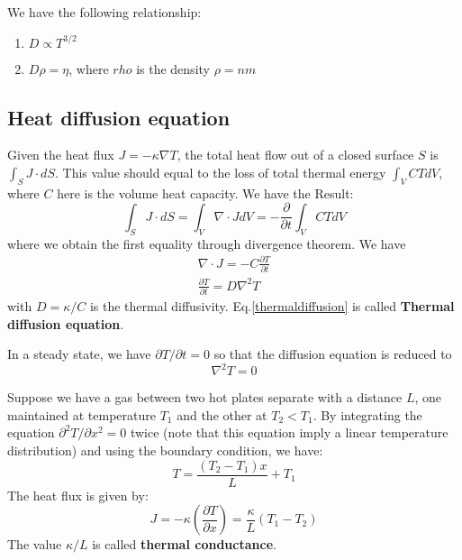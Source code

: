 \documentclass{article}
\begin{document}
We have the following relationship:
\begin{enumerate}
    \item $ D \propto T^{3/2}$
    \item $D \rho = \eta $, where $rho$ is the density $\rho = nm$
\end{enumerate}

\subsection{Heat diffusion equation}
Given the heat flux $J = - \kappa \nabla T$, the total heat flow out of a closed surface $S$ is $\int_S J \cdot dS$.
This value should equal to the loss of total thermal energy $\int_V CT dV$, where $C$ here is the volume heat capacity. 
We have the Result:
\begin{equation}
    \int_S J \cdot dS = \int_V \nabla \cdot J dV = -\frac{\partial}{\partial t} \int_V CT dV
\end{equation}
where we obtain the first equality through divergence theorem. We have
\begin{align}
    \nabla \cdot J = -C \frac{\partial T}{\partial t} \\
    \frac{\partial T}{\partial t} = D \nabla^2 T \label{thermaldiffusion}
\end{align}
with $D = \kappa/C$ is the thermal diffusivity.
Eq.\ref{thermaldiffusion} is called \textbf{Thermal diffusion equation}.

In a steady state, we have $\partial T / \partial t = 0 $ so that the 
diffusion equation is reduced to 
\begin{equation}
    \nabla^2 T = 0
\end{equation}

Suppose we have a gas between two hot plates separate with a distance $L$, 
one maintained at temperature $T_1$ and the other at $T_2 < T_1$. By integrating
the equation $\partial^2 T / \partial x^2 = 0$ twice 
(note that this equation imply a linear temperature distribution)
and using the boundary condition,
we have:
\begin{equation}
    T = \frac{(T_2-T_1)x}{L} + T_1 
\end{equation}
The heat flux is given by:
\begin{equation}
    J = - \kappa \left( \frac{\partial T}{\partial x} \right) = \frac{\kappa}{L} (T_1 - T_2)
\end{equation}
The value $\kappa / L$ is called \textbf{thermal conductance}.
\end{document}
